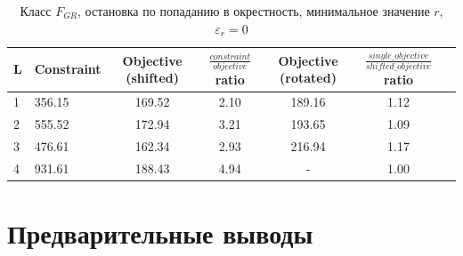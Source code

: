 \documentclass[a4paper]{article}
\begin{document}
\begin{table}[H]
\begin{center}
\caption{Класс $F_{GR}$, остановка по попаданию в окрестность, минимальное значение $r$, $\varepsilon_r=0$}
  \begin{tabular}{l|l*{5}{c}}
    \label{table:exp4}
  L & Constraint & Objective (shifted) & $\frac{constraint}{objective}$ ratio & Objective (rotated) & $\frac{single\_objective}{shifted\_objective}$ ratio \\
  \hline
  1 & 356.15 & 169.52 & 2.10 & 189.16 & 1.12 \\
  2 & 555.52 & 172.94 & 3.21 & 193.65 & 1.09 \\
  3 & 476.61 & 162.34 & 2.93 & 216.94 & 1.17 \\
  4 & 931.61 & 188.43 & 4.94 &  -     & 1.00 \\
  \end{tabular}
\end{center}
\end{table}

\section{Предварительные выводы}
\end{document}
